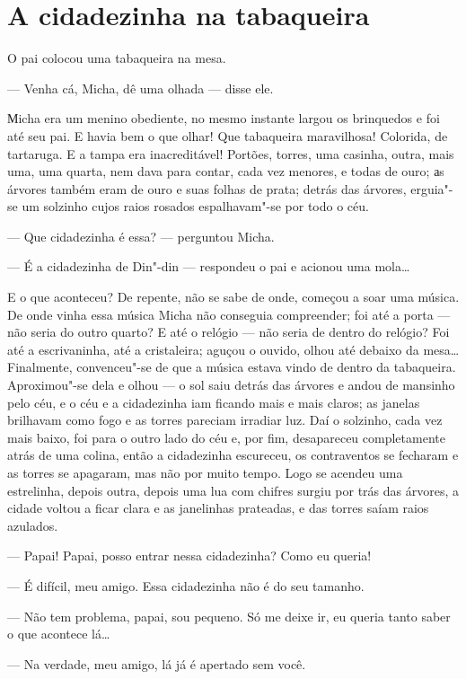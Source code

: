 \chapter{A cidadezinha na tabaqueira}

O pai colocou uma tabaqueira na mesa.

--- Venha cá, Micha, dê uma olhada --- disse ele.

Мicha era um menino obediente, no mesmo instante largou os brinquedos e
foi até seu pai. E havia bem o que olhar! Que tabaqueira maravilhosa!
Colorida, de tartaruga. E a tampa era inacreditável! Portões, torres,
uma casinha, outra, mais uma, uma quarta, nem dava para contar, cada vez
menores, e todas de ouro; аs árvores também eram de ouro e suas folhas
de prata; detrás das árvores, erguia"-se um solzinho cujos raios rosados
espalhavam"-se por todo o céu.

--- Que cidadezinha é essa? --- perguntou Micha.

--- É a cidadezinha de Din"-din --- respondeu o pai e acionou uma
mola\ldots{}

E o que aconteceu? De repente, não se sabe de onde, começou a soar uma
música. De onde vinha essa música Micha não conseguia compreender; foi
até a porta --- não seria do outro quarto? E até o relógio --- não seria
de dentro do relógio? Foi até a escrivaninha, até a cristaleira; aguçou
o ouvido, olhou até debaixo da mesa\ldots{} Finalmente, convenceu"-se de
que a música estava vindo de dentro da tabaqueira. Aproximou"-se dela e
olhou --- o sol saiu detrás das árvores e andou de mansinho pelo céu, e
o céu e a cidadezinha iam ficando mais e mais claros; as janelas
brilhavam como fogo e as torres pareciam irradiar luz. Daí o solzinho,
cada vez mais baixo, foi para o outro lado do céu e, por fim,
desapareceu completamente atrás de uma colina, então a cidadezinha
escureceu, os contraventos se fecharam e as torres se apagaram, mas não
por muito tempo. Logo se acendeu uma estrelinha, depois outra, depois
uma lua com chifres surgiu por trás das árvores, a cidade voltou a ficar
clara e as janelinhas prateadas, e das torres saíam raios azulados.

--- Papai! Papai, posso entrar nessa cidadezinha? Como eu queria!

--- É difícil, meu amigo. Essa cidadezinha não é do seu tamanho.

--- Não tem problema, papai, sou pequeno. Só me deixe ir, eu queria
tanto saber o que acontece lá\ldots{}

--- Na verdade, meu amigo, lá já é apertado sem você.

